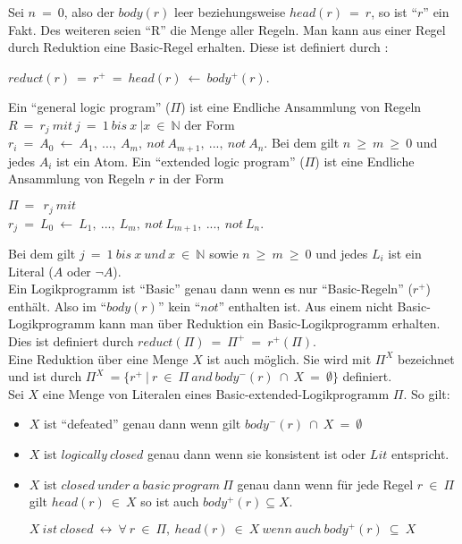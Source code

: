 Sei $n~=~0$, also der $body(r)$ leer beziehungsweise $head(r)~=~r$, so ist ``$r$'' ein Fakt. Des weiteren seien ``R'' die Menge aller Regeln.
Man kann aus einer Regel durch Reduktion eine Basic-Regel erhalten. Diese ist definiert durch :\\
\begin{center}
  $reduct(r)~=~r^+~=~head(r)~\leftarrow~body^+(r)$.\\
\end{center}

Ein ``general logic program'' ($\Pi$)  ist eine Endliche Ansammlung von Regeln $R~=~r_j~mit~j~=~1~bis~x~|x~\in~\mathbb{N}$ der Form $r_i~=~A_0~\leftarrow~A_1,~...,~A_m,~not~A_{m+1},~...,~not~A_n$. Bei dem gilt $n~\geq~m~\geq~0$ und jedes $A_i$ ist ein Atom. Ein ``extended logic program'' ($\Pi$) ist eine Endliche Ansammlung von Regeln $r$ in der Form 

\begin{center}
	$\Pi~=~~r_j~mit$ \\
	$r_j~=~L_0~\leftarrow~L_1,~...,~L_m,~not~L_{m+1},~...,~not~L_n$. \\
\end{center}

Bei dem gilt $j~=~1~bis~x~und~x~\in~\mathbb{N}$ sowie $n~\geq~m~\geq~0$ und jedes $L_i$ ist ein Literal ($A$ oder $\neg A$).\\

Ein Logikprogramm ist ``Basic'' genau dann wenn es nur ``Basic-Regeln'' ($r^+$) enthält. Also im ``$body(r)$'' kein ``$not$'' enthalten ist. Aus einem nicht Basic-Logikprogramm kann man über Reduktion ein Basic-Logikprogramm erhalten. Dies ist definiert durch $reduct(\Pi)~=~\Pi^+~=~r^+(\Pi)$. \\
  
Eine Reduktion über eine Menge $X$ ist auch möglich. Sie wird mit $\Pi^X$ bezeichnet und ist durch $\Pi^X~=\{r^+~|~r~\in~\Pi~and~body^-(r)~\cap~X~=~\emptyset \}$ definiert. \\

Sei $X$ eine Menge von Literalen eines Basic-extended-Logikprogramm $\Pi$. So gilt:

\begin{itemize}
	\item $X$ ist ``defeated'' genau dann wenn gilt $body^-(r)~\cap~X~=~\emptyset$
	\item $X$ ist $logically~closed$ genau dann wenn sie konsistent ist oder $Lit$ entspricht.	
	\item $X$ ist $closed~under~a~basic~program~\Pi$ genau dann wenn für jede Regel $r~\in~\Pi$	gilt $head(r)~\in~X$ so ist auch $body^+(r) \subseteq X$.
	 	 \begin{center}
	     $X~ist~closed~\leftrightarrow~\forall~r~\in~\Pi,~head(r)~\in~X~wenn~auch~body^+(r)~\subseteq~X$ \\
     \end{center}
\end{itemize}

